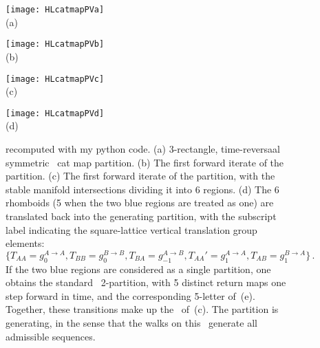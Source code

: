 \begin{description}
\begin{figure}
  \centering
\begin{minipage}[b]{0.22\textwidth}  \centering
    \texttt{[image: HLcatmapPVa]}\\(a)
\end{minipage}
\begin{minipage}[b]{0.22\textwidth}  \centering
    \texttt{[image: HLcatmapPVb]}\\(b)
\end{minipage}
\begin{minipage}[b]{0.22\textwidth}  \centering
    \texttt{[image: HLcatmapPVc]}\\(c)
\end{minipage}
\begin{minipage}[b]{0.22\textwidth}  \centering
    \texttt{[image: HLcatmapPVd]}\\ (d)
\end{minipage}
  \caption{\label{fig:HLcatmapPV}
 recomputed with my python code.
(a) 3-rectangle, time-reversaal symmetric
\PV\ cat map  partition.
(b) The first forward iterate of the partition.
(c) The first forward iterate of the partition, with the stable manifold
intersections dividing it into 6 regions.
(d) The 6 rhomboids (5 when the two blue regions are treated as one)
are translated back into the generating partition, with
the subscript label indicating the square-lattice vertical translation group
elements:
$\{
T_{AA}=g^{A \to A}_{0},
T_{BB}=g^{B \to B}_{0},
T_{BA}=g^{A \to B}_{-1},
T_{AA}'=g^{A \to A}_{1},
T_{AB}=g^{B \to A}_{1}
\}\,.$
If the two blue regions are considered as a single partition, one obtains
the standard \AW\ 2-partition, with 5 distinct return maps one step
forward in time, and the corresponding 5-letter {\markGraph} of
\,(e).
Together, these transitions make up the \markGraph\
of \,(c). The partition is generating,
in the sense that the walks on this \markGraph\ generate
all admissible sequences.
}
\end{figure}


\end{description}
